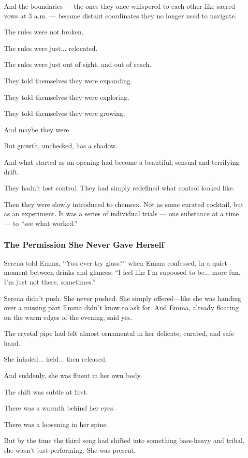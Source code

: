 And the boundaries --- the ones they once whispered to each other like sacred vows at 
3 a.m. --- became distant coordinates they no longer used to navigate.

The rules were not broken.

The rules were just... relocated.

The rules were just out of sight, and out of reach.

They told themselves they were expanding. 

They told themselves they were exploring. 

They told themselves they were growing.

And maybe they were.

But growth, unchecked, has a shadow.

And what started as an opening had become a beautiful, sensual and terrifying drift.

They hadn’t lost control.
They had simply redefined what control looked like.

Then they were slowly introduced to chemsex. Not as some curated cocktail, but as an experiment. 
It was a series of individual trials --- one substance at a time --- to ``see what worked.'' 

\subsubsection{The Permission She Never Gave Herself}

Serena told Emma, “You ever try glass?” when Emma confessed, in a quiet moment between drinks and glances,
“I feel like I’m supposed to be... more fun. I’m just not there, sometimes.”

Serena didn’t push. She never pushed. She simply offered—like she was handing over a missing part Emma 
didn’t know to ask for.  And Emma, already floating on the warm edges of the evening, said yes.

The crystal pipe had felt almost ornamental in her delicate, curated, and safe hand.

She inhaled... held... then released.

And suddenly, she was fluent in her own body.

The shift was subtle at first. 

There was a warmth behind her eyes. 

There was a loosening in her spine. 

But by the time the third song had shifted into something bass-heavy and tribal, she wasn’t just performing. 
She was present.

